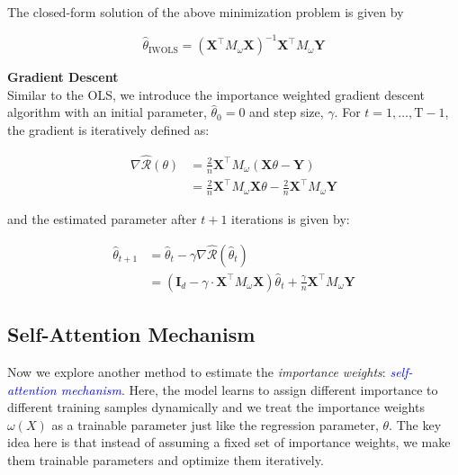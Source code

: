 The closed-form solution of the above minimization problem \citep{aitken1936least, rao1945information} is given by

\begin{equation}
    \hat{\theta}_{\text{IWOLS}} = (\mathbf{X}^\top M_{\omega} \mathbf{X})^{-1}\mathbf{X}^\top M_{\omega} \mathbf{Y}
    \label{eqn:3.10}
\end{equation}

\vspace{1em}
\textbf{Gradient Descent}\\

Similar to the OLS, we introduce the importance weighted gradient descent algorithm with an initial parameter, $\hat{\theta}_0 = 0$ and step size, $\gamma$. For $t = 1, \ldots, \text{T}-1$, the gradient is iteratively defined as:

\begin{equation}
    \begin{aligned}
        \nabla \hat{\mathcal{R}}(\theta) &= \frac{2}{n} \mathbf{X}^\top M_{\omega} (\mathbf{X}\theta - \mathbf{Y})\\
        &= \frac{2}{n} \mathbf{X}^\top M_{\omega}\mathbf{X}\theta - \frac{2}{n} \mathbf{X}^\top M_{\omega} \mathbf{Y}
    \end{aligned}
    \label{eqn:3.11}
\end{equation}

and the estimated parameter after $t+1$ iterations is given by:

\begin{equation}
    \begin{aligned}
        \hat{\theta}_{t+1} &= \hat{\theta}_t - \gamma \nabla \hat{\mathcal{R}}(\hat{\theta}_t)\\
        &= (\mathbf{I}_d - \gamma \cdot \mathbf{X}^\top M_{\omega} \mathbf{X})\hat{\theta}_t + \frac{\gamma}{n} \mathbf{X}^\top M_{\omega} \mathbf{Y}
    \end{aligned}
    \label{eqn:3.12}
\end{equation}

\subsection{Self-Attention Mechanism}\label{self-attention}

Now we explore another method to estimate the \emph{importance weights}: \textcolor{blue}{\emph{self-attention mechanism}}. Here, the model learns to assign different importance to different training samples dynamically and we treat the importance weights $\omega(X)$ as a trainable parameter just like the regression parameter, $\theta$. The key idea here is that instead of assuming a fixed set of importance weights, we make them trainable parameters and optimize them iteratively.\\

